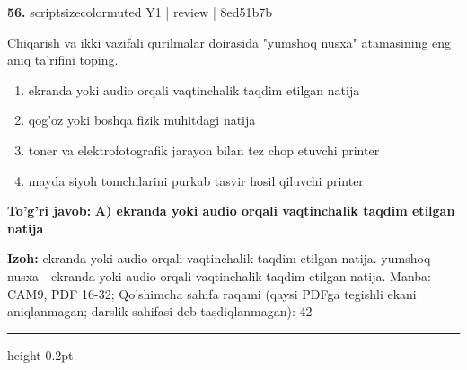 \documentclass[10pt,a4paper]{article}
\begin{document}
{\bfseries\sffamily\color{ink} 56.} {scriptsizecolor{muted} Y1 | review | 8ed51b7b}
\par
Chiqarish va ikki vazifali qurilmalar doirasida "yumshoq nusxa" atamasining eng aniq ta'rifini toping.
\begin{enumerate}[label=\Alph*),leftmargin=9mm]
\item ekranda yoki audio orqali vaqtinchalik taqdim etilgan natija
\item qog'oz yoki boshqa fizik muhitdagi natija
\item toner va elektrofotografik jarayon bilan tez chop etuvchi printer
\item mayda siyoh tomchilarini purkab tasvir hosil qiluvchi printer
\end{enumerate}
\begin{tcolorbox}[enhanced,breakable,colback=teal!4,colframe=teal!60!black,boxrule=0.45pt,arc=1.2mm,left=2.7mm,right=2.7mm,top=1.8mm,bottom=1.8mm,before skip=2mm,after skip=2mm]
{\bfseries\sffamily\color{teal}To'g'ri javob:} \textbf{A) ekranda yoki audio orqali vaqtinchalik taqdim etilgan natija}
\par\smallskip
{\bfseries Izoh:} ekranda yoki audio orqali vaqtinchalik taqdim etilgan natija. yumshoq nusxa - ekranda yoki audio orqali vaqtinchalik taqdim etilgan natija. Manba: CAM9, PDF 16-32; Qo'shimcha sahifa raqami (qaysi PDFga tegishli ekani aniqlanmagan; darslik sahifasi deb tasdiqlanmagan): 42
\end{tcolorbox}
\vspace{2mm}\hrule height 0.2pt\vspace{3mm}
\end{document}
